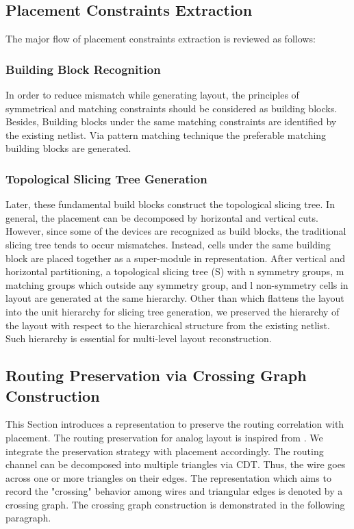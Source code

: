     \subsection{Placement Constraints Extraction}\label{sec:PlExtract}



      The major flow of placement constraints extraction \cite{ALP_YPWeng_iccad2011} is reviewed as follows:
      \subsubsection{Building Block Recognition}
        In order to reduce mismatch while generating layout, the principles of symmetrical and matching constraints should be considered as building blocks. 
        Besides, Building blocks under the same matching constraints are identified by the existing netlist. Via pattern matching technique \cite{Massier_TCAD08} the preferable matching building blocks are generated.

      \subsubsection{Topological Slicing Tree Generation}
        Later, these fundamental build blocks construct the topological slicing tree. In general, the placement can be decomposed by horizontal and vertical cuts. However, since some of the devices are recognized as build blocks, the traditional slicing tree tends to occur mismatches. Instead, cells under the same building block are placed together as a super-module in representation. After vertical and horizontal  partitioning, a topological slicing tree (S) with n symmetry groups, m matching groups which outside any symmetry group, and l non-symmetry cells in layout are generated at the same hierarchy. Other than \cite{ALP_YPWeng_iccad2011} which flattens the layout into the unit hierarchy for slicing tree generation, we preserved the hierarchy of the layout with respect to the hierarchical structure from the existing netlist. Such hierarchy is essential for multi-level layout reconstruction. 
    \subsection{Routing Preservation via Crossing Graph Construction}\label{sec:CGC}

      This Section introduces a representation to preserve the routing correlation with placement. The routing preservation for analog layout is inspired from \cite{Chin_DMR_ICCAD2013}. We integrate the preservation strategy with placement accordingly. The routing channel can be decomposed into multiple triangles via CDT. Thus, the wire goes across one or more triangles on their edges. The representation which aims to record the "crossing" behavior among wires and triangular edges is denoted by a crossing graph. The crossing graph construction is demonstrated in the following paragraph. 

